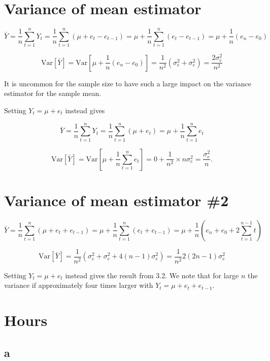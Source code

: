 \documentclass[]{book}
\begin{document}
\section{Variance of mean estimator}\label{variance-of-mean-estimator}

\[
  \bar{Y} = \frac{1}{n}\sum_{t=1}^n Y_t = \frac{1}{n} \sum_{t=1}^n(\mu + e_t - e_{t-1}) = 
    \mu + \frac{1}{n} \sum_{t=1}^n (e_t - e_{t-1}) = \mu + \frac{1}{n}(e_n - e_0)
\]

\[
  \text{Var}[\bar{Y}] = \text{Var}[\mu + \frac{1}{n}(e_n - e_0)] =
    \frac{1}{n^2}(\sigma_e^2 + \sigma_e^2) = \frac{2\sigma_e^2}{n^2}
\]

It is uncommon for the sample size to have such a large impact on the
variance estimator for the sample mean.

Setting \(Y_t = \mu + e_t\) instead gives

\[
  \bar{Y} = \frac{1}{n}\sum_{t=1}^n Y_t = \frac{1}{n} \sum_{t=1}^n(\mu + e_t) = 
    \mu + \frac{1}{n} \sum_{t=1}^n e_t
\]

\[
  \text{Var}[\bar{Y}] = \text{Var} \left[ \mu + \frac{1}{n} \sum_{t=1}^n e_t \right] =
    0 + \frac{1}{n^2} \times n \sigma_e^2 = \frac{\sigma_e^2}{n}.
\]

\section{Variance of mean estimator
\#2}\label{variance-of-mean-estimator-2}

\[
  \bar{Y} = \frac{1}{n} \sum_{t=1}^n(\mu + e_t + e_{t-1}) = 
    \mu + \frac{1}{n} \sum_{t=1}^n (e_t + e_{t-1}) = \mu + \frac{1}{n} \left( e_n + e_0 + 2 \sum_{t=1}^{n-1} t \right)
\]

\[
  \text{Var}[\bar{Y}] = \frac{1}{n^2}(\sigma_e^2 + \sigma_e^2 + 4(n-1) \sigma_e^2 ) = \frac{1}{n^2}2(2n-1)\sigma_e^2
\]

Setting \(Y_t = \mu + e_t\) instead gives the result from 3.2. We note
that for large \(n\) the variance if approximately four times larger
with \(Y_t = \mu + e_t + e_{t-1}\).

\section{Hours}\label{hours}

\subsection*{a}\label{a-21}
\end{document}
